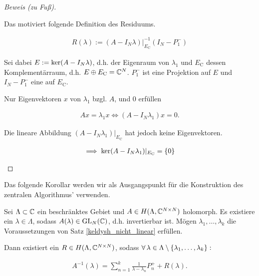 \begin{proof}[Beweis (zu Fuß)]
\begin{enumerate}[label = (\roman*)]
        Das motiviert folgende Definition des Residuums.

        \begin{align*}
            R(\lambda)
            :=
            (A - I_N \lambda) |_{E_\mathrm{C}}^{-1} (I_N - P_1^-)
        \end{align*}

        Sei dabei $E := \operatorname{ker}(A - I_N \lambda)$, d.h. der Eigenraum von $\lambda_1$ und $E_\mathrm{C}$ dessen Komplementärraum, d.h. $E \oplus E_\mathrm{C} = \mathbb{C}^N$.
        $P_1^-$ ist eine Projektion auf $E$ und $I_N - P_1^-$ eine auf $E_\mathrm{C}$.

        Nur Eigenvektoren $x$ von $\lambda_1$ bzgl. $A$, und $0$ erfüllen

        \begin{align*}
            A x = \lambda_1 x
            \iff
            (A - I_N \lambda_1) x = 0.
        \end{align*}

        Die lineare Abbildung $(A - I_N \lambda_1) |_{E_\mathrm{C}}$ hat jedoch keine Eigenvektoren.

        \begin{align*}
            \implies
            \operatorname{ker}(A - I_N \lambda_1) |_{E_\mathrm{C}} = {\left \{ 0 \right \}}
        \end{align*}



    \end{enumerate}

\end{proof}

Das folgende Korollar werden wir als Ausgangspunkt für die Konstruktion des zentralen Algorithmus' verwenden.

\begin{corollary} \label{keldysh_multi}

    Sei $\Lambda \subset \mathbb{C}$ ein beschränktes Gebiet und $A \in H(\Lambda, \mathbb{C}^{N \times N})$ holomorph.
    Es existiere ein $\lambda \in \Lambda$, sodass $A(\lambda) \in \operatorname{GL}_N(\mathbb{C})$, d.h. invertierbar ist.
    Mögen $\lambda_1, \dots, \lambda_k$ die Voraussetzungen von Satz \ref{keldysh_nicht_linear} erfüllen.

    Dann existiert ein $R \in H(\Lambda, \mathbb{C}^{N \times N})$, sodass $\forall \, \lambda \in \Lambda \setminus {\left \{ \lambda_1, \dots, \lambda_k \right \}}:$

    \begin{align*}
        A^{-1}(\lambda)
        =
        \sum_{n=1}^k
            \frac{1}{\lambda - \lambda_n} P_n^+
        +
        R(\lambda).
    \end{align*}

\end{corollary}

